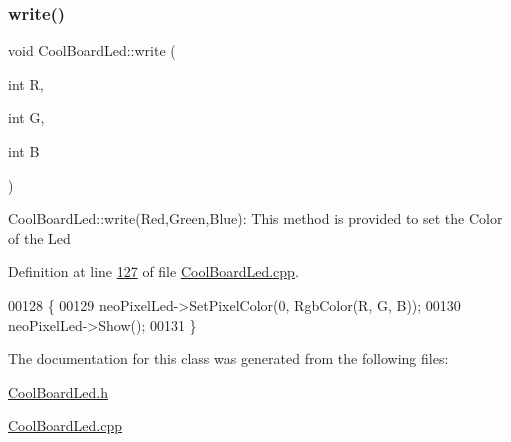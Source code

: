 \subsubsection{\texorpdfstring{write()}{write()}}
{\footnotesize\ttfamily void Cool\+Board\+Led\+::write (\begin{DoxyParamCaption}\item[{int}]{R,  }\item[{int}]{G,  }\item[{int}]{B }\end{DoxyParamCaption})}

Cool\+Board\+Led\+::write(\+Red,\+Green,\+Blue)\+: This method is provided to set the Color of the Led 

Definition at line \hyperlink{_cool_board_led_8cpp_source_l00127}{127} of file \hyperlink{_cool_board_led_8cpp_source}{Cool\+Board\+Led.\+cpp}.


\begin{DoxyCode}
00128 \{
00129     neoPixelLed->SetPixelColor(0, RgbColor(R, G, B));
00130     neoPixelLed->Show();
00131 \}
\end{DoxyCode}


The documentation for this class was generated from the following files\+:\begin{DoxyCompactItemize}
\item 
\hyperlink{_cool_board_led_8h}{Cool\+Board\+Led.\+h}\item 
\hyperlink{_cool_board_led_8cpp}{Cool\+Board\+Led.\+cpp}\end{DoxyCompactItemize}
